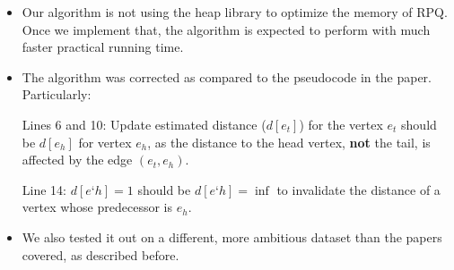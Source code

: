 \documentclass[12pt]{article}
\begin{document}
\begin{itemize}
\item Our algorithm is not using the heap library to optimize the memory of RPQ. Once we implement that, the algorithm is expected to perform with much faster practical running time.
\item The algorithm was corrected as compared to the pseudocode in the paper. Particularly: 

Lines 6 and 10: Update estimated distance ($d[e_t]$) for the vertex $e_t$ should be $d[e_h]$ for vertex $e_h$, as the distance to the head vertex, \textbf{not} the tail, is affected by the edge $(e_t, e_h)$.

Line 14: $d[e‘h ] = 1$ should be $d[e‘h ] = \inf$  to invalidate the distance of a vertex whose predecessor is $e_h$.

\item We also tested it out on a different, more ambitious dataset than the papers covered, as described before. 

\end{itemize}
\end{document}
